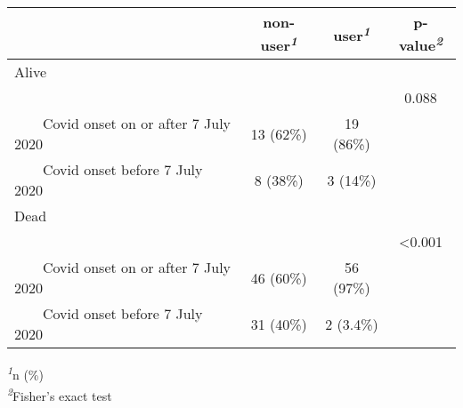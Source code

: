 \setlength{\LTpost}{0mm}
\begin{longtable}{lccc}
\toprule
 & \textbf{non-user}\textsuperscript{\textit{1}} & \textbf{user}\textsuperscript{\textit{1}} & \textbf{p-value}\textsuperscript{\textit{2}} \\ 
\midrule
\multicolumn{4}{l}{Alive} \\ 
\midrule
 &  &  & 0.088 \\ 
    Covid onset on or after 7 July 2020 & 13 (62\%) & 19 (86\%) &  \\ 
    Covid onset before 7 July 2020 & 8 (38\%) & 3 (14\%) &  \\ 
\midrule
\multicolumn{4}{l}{Dead} \\ 
\midrule
 &  &  & <0.001 \\ 
    Covid onset on or after 7 July 2020 & 46 (60\%) & 56 (97\%) &  \\ 
    Covid onset before 7 July 2020 & 31 (40\%) & 2 (3.4\%) &  \\ 
\bottomrule
\end{longtable}
\begin{minipage}{\linewidth}
\textsuperscript{\textit{1}}n (\%)\\
\textsuperscript{\textit{2}}Fisher's exact test\\
\end{minipage}

